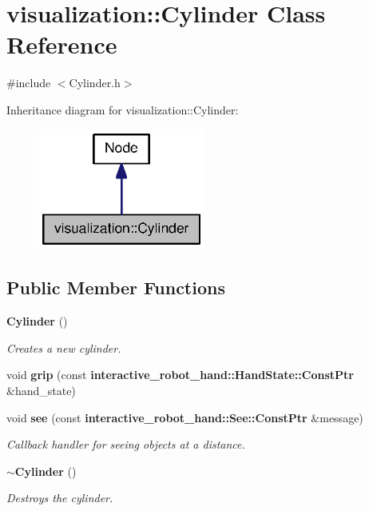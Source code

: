 \section{visualization\-:\-:Cylinder Class Reference}
\label{classvisualization_1_1Cylinder}


{\ttfamily \#include $<$Cylinder.\-h$>$}



Inheritance diagram for visualization\-:\-:Cylinder\-:
\nopagebreak
\begin{figure}[H]
\begin{center}
\leavevmode
\includegraphics[width=156pt]{classvisualization_1_1Cylinder__inherit__graph}
\end{center}
\end{figure}
\subsection*{Public Member Functions}
\begin{DoxyCompactItemize}
\item 
{\bf Cylinder} ()
\begin{DoxyCompactList}\small\item\em Creates a new cylinder. \end{DoxyCompactList}\item 
void {\bf grip} (const {\bf interactive\-\_\-robot\-\_\-hand\-::\-Hand\-State\-::\-Const\-Ptr} \&hand\-\_\-state)
\item 
void {\bf see} (const {\bf interactive\-\_\-robot\-\_\-hand\-::\-See\-::\-Const\-Ptr} \&message)
\begin{DoxyCompactList}\small\item\em Callback handler for seeing objects at a distance. \end{DoxyCompactList}\item 
{\bf $\sim$\-Cylinder} ()
\begin{DoxyCompactList}\small\item\em Destroys the cylinder. \end{DoxyCompactList}\end{DoxyCompactItemize}
